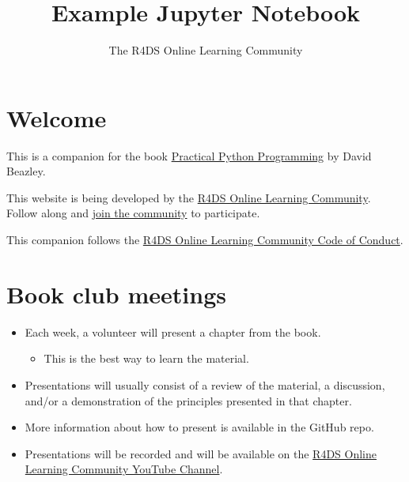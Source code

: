 \documentclass[
  letterpaper,
  DIV=11,
  numbers=noendperiod]{scrreprt}
\title{Example Jupyter Notebook}
\subtitle{The R4DS Online Learning Community}
\author{}
\date{}
\providecommand{\tightlist}{%
  \setlength{\itemsep}{0pt}\setlength{\parskip}{0pt}}
\renewcommand*\contentsname{Table of contents}
\begin{document}
\maketitle

\ifdefined\Shaded\renewenvironment{Shaded}{\begin{tcolorbox}[frame hidden, boxrule=0pt, interior hidden, borderline west={3pt}{0pt}{shadecolor}, enhanced, sharp corners]}{\end{tcolorbox}}\fi

\renewcommand*\contentsname{Table of contents}
{
\hypersetup{linkcolor=}
\setcounter{tocdepth}{2}
\tableofcontents
}
\hypertarget{welcome}{%
\section*{Welcome}\label{welcome}}

This is a companion for the book
\href{https://dabeaz-course.github.io/practical-python/}{Practical
Python Programming} by David Beazley.

This website is being developed by the
\href{https://rfordatasci.com/}{R4DS Online Learning Community}. Follow
along and \href{https://r4ds.io/join}{join the community} to
participate.

This companion follows the \href{https://r4ds.io/conduct}{R4DS Online
Learning Community Code of Conduct}.

\hypertarget{book-club-meetings}{%
\section*{Book club meetings}\label{book-club-meetings}}

\begin{itemize}
\item
  Each week, a volunteer will present a chapter from the book.

  \begin{itemize}
  \tightlist
  \item
    This is the best way to learn the material.
  \end{itemize}
\item
  Presentations will usually consist of a review of the material, a
  discussion, and/or a demonstration of the principles presented in that
  chapter.
\item
  More information about how to present is available in the GitHub repo.
\item
  Presentations will be recorded and will be available on the
  \href{https://r4ds.io/youtube}{R4DS Online Learning Community YouTube
  Channel}.
\end{itemize}
\end{document}
